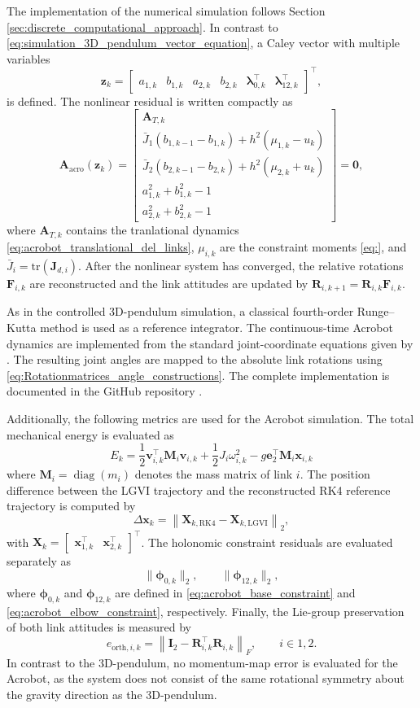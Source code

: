 The implementation of the numerical simulation follows Section \ref{sec:discrete_computational_approach}. In contrast to \eqref{eq:simulation_3D_pendulum_vector_equation}, a Caley vector with multiple variables
\[
\bm{z}_k
=
\begin{bmatrix}
a_{1,k} & b_{1,k} & a_{2,k} & b_{2,k} &
\bm{\lambda}_{0,k}^{\top} &
\bm{\lambda}_{12,k}^{\top}
\end{bmatrix}^{\top},
\]
is defined. The nonlinear residual is written compactly as
\[
\bm{A}_{\mathrm{acro}}(\bm{z}_k)
=
\begin{bmatrix}
\bm{A}_{T,k}\\
\bar{J}_{1}(b_{1,k-1}-b_{1,k})+h^2(\mu_{1,k}-u_k)\\
\bar{J}_{2}(b_{2,k-1}-b_{2,k})+h^2(\mu_{2,k}+u_k)\\
a_{1,k}^2+b_{1,k}^2-1\\
a_{2,k}^2+b_{2,k}^2-1
\end{bmatrix}
=
\bm{0},
\]
where \(\bm{A}_{T,k}\) contains the tranlational dynamics \eqref{eq:acrobot_translational_del_links}, \(\mu_{i,k}\) are the constraint moments \eqref{eq:}, and \(\bar{J}_i=\mathrm{tr}(\bm{J}_{d,i})\). After the nonlinear system has converged, the relative rotations \(\bm{F}_{i,k}\) are reconstructed and the link attitudes are updated by \(\bm{R}_{i,k+1}=\bm{R}_{i,k}\bm{F}_{i,k}\).

As in the controlled 3D-pendulum simulation, a classical fourth-order Runge--Kutta method is used as a reference integrator. The continuous-time Acrobot dynamics are implemented from the standard joint-coordinate equations given by \cite{tedrake_underactuated}. The resulting joint angles are mapped to the absolute link rotations using \eqref{eq:Rotationmatrices_angle_constructions}. The complete implementation is documented in the GitHub repository \cite{Elshani2026CTO_GitHub}.

Additionally, the following metrics are used for the Acrobot simulation. 
The total mechanical energy is evaluated as
\[
E_k
=
\frac{1}{2}\bm{v}_{i,k}^{\top}\bm{M}_i\bm{v}_{i,k}
+
\frac{1}{2}J_i\omega_{i,k}^{2}
-
g \bm{e}_2^{\top}\bm{M}_i\bm{x}_{i,k}
\]
where $\bm{M}_i = \operatorname{diag}(m_i)$ denotes the mass matrix of link $i$. The position difference between the LGVI trajectory and the reconstructed RK4 reference trajectory is computed by
\[
\Delta \bm{x}_k
=
\left\|
\bm{X}_{k,\mathrm{RK4}}
-
\bm{X}_{k,\mathrm{LGVI}}
\right\|_2,
\]
with $\bm{X}_k =
\begin{bmatrix}
\bm{x}_{1,k}^{\top} & \bm{x}_{2,k}^{\top}
\end{bmatrix}^{\top}$. The holonomic constraint residuals are evaluated separately as
\[
\|\bm{\phi}_{0,k}\|_2,
\qquad
\|\bm{\phi}_{12,k}\|_2,
\]
where $\bm{\phi}_{0,k}$ and $\bm{\phi}_{12,k}$ are defined in \eqref{eq:acrobot_base_constraint} and \eqref{eq:acrobot_elbow_constraint}, respectively. Finally, the Lie-group preservation of both link attitudes is measured by
\[
e_{\mathrm{orth},i,k}
=
\left\|
\bm{I}_2 - \bm{R}_{i,k}^{\top}\bm{R}_{i,k}
\right\|_F,
\qquad
i\in{1,2}.
\]
In contrast to the 3D-pendulum, no momentum-map error is evaluated for the Acrobot, as the system does not consist of the same rotational symmetry about the gravity direction as the 3D-pendulum.

